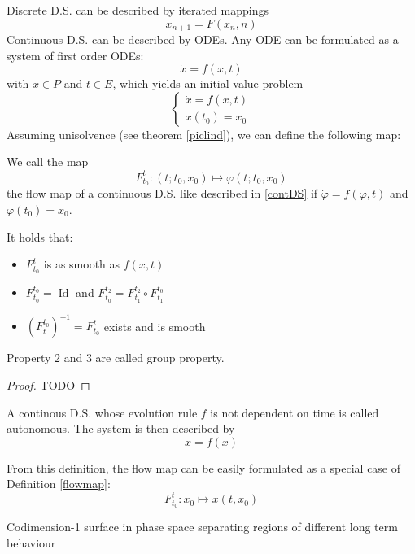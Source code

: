 Discrete D.S. can be described by iterated mappings
\begin{equation}
\label{contDS}
    x_{n+1} = F(x_n,n)
\end{equation}
Continuous D.S. can be described by ODEs. Any ODE can be formulated as a system of first order ODEs:
\begin{equation}
    \dot x = f(x,t)
\end{equation}
with $ x\in P$ and $t\in E$, which yields an initial value problem
\begin{equation}
\label{IVprob}
\begin{cases}
    \dot x = f(x,t)\\
    x(t_0) = x_0
\end{cases}
\end{equation}
Assuming unisolvence (see theorem \ref{piclind}), we can define the following map:
\begin{framed}
\begin{definition}
\label{flowmap}
    We call the map 
    $$F_{t_0}^t:(t;t_0,x_0)\mapsto \varphi(t;t_0,x_0)$$
    the flow map of a continuous D.S. like described in \eqref{contDS} if $\dot\varphi=f(\varphi,t)$ and $\varphi(t_0)=x_0$.
\end{definition}
\end{framed}
\begin{framed}
\begin{lemma}
    It holds that:
    \begin{itemize} [itemsep=3pt, topsep=3pt]
        \item $F_{t_0}^t$ is as smooth as $f(x,t)$
        \item $F_{t_0}^{t_0} = \operatorname{Id}$ and $F_{t_0}^{t_2}=F_{t_1}^{t_2} \circ F_{t_1}^{t_0}$
        \item $\left ( F_{t}^{t_0} \right )^{-1}=F_{t_0}^{t}$ exists and is smooth
    \end{itemize}
    Property 2 and 3 are called group property.
\end{lemma}
\end{framed}
\begin{proof}
    TODO
\end{proof}
\begin{framed}
\begin{definition}
    A continous D.S. whose evolution rule $f$ is not dependent on time is called autonomous. The system is then described by
    $$\dot x=f(x)$$
\end{definition}
\end{framed}
From this definition, the flow map can be easily formulated as a special case of Definition \ref{flowmap}:
$$F_{t_0}^t: x_0 \mapsto x(t,x_0)$$

\begin{framed}
\begin{definition}[Separatrix]
    Codimension-1 surface in phase space separating regions of different long term behaviour
\end{definition}
\end{framed}

